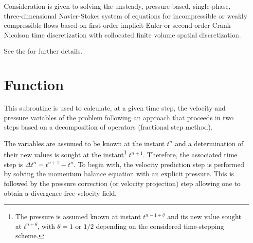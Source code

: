 
%
%
%
%


\label{ap:cs_solve_navier_stokes}

\hypertarget{cs\_solve\_navier\_stokes}{}

Consideration is given to solving the unsteady, pressure-based,
single-phase, three-dimensional Navier-Stokes system of equations for
incompressible or weakly compressible flows based on first-order implicit
Euler or second-order Crank-Nicolson time discretization with collocated
finite volume spatial discretization.

See the  for further details.

\section*{Function}

This subroutine is used to calculate, at a given time step, the velocity
 and pressure variables of the problem following an approach that proceeds
 in two steps based on a decomposition of operators (fractional step method).

The variables are assumed to be known at the instant ${t^n}$ and a
determination of their new values is sought at the
instant\footnote{The pressure is assumed known at instant $t^{n-1+\theta}$
and its new value sought at $t^{n+\theta}$, with $\theta=1$ or $1/2$
depending on the considered time-stepping scheme.} ${t^{n+1}}$.
Therefore, the associated time step is ${\Delta {t^n} ={t^{n+1}- {t^n}}}$.
To begin with, the velocity prediction step is performed by solving the
momentum balance equation with an explicit pressure. This is followed by
the pressure correction (or velocity projection) step allowing one to obtain
a divergence-free velocity field.

